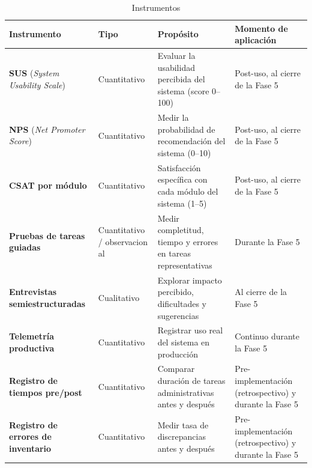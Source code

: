 \begin{longtable}[]{@{}
  >{\raggedright\arraybackslash}p{}
  >{\raggedright\arraybackslash}p{}
  >{\raggedright\arraybackslash}p{}
  >{\raggedright\arraybackslash}p{}@{}}
\caption[Instrumentos]{Instrumentos}\tabularnewline
\toprule\noalign{}
\begin{minipage}[b]{\linewidth}\raggedright
Instrumento
\end{minipage} & \begin{minipage}[b]{\linewidth}\raggedright
Tipo
\end{minipage} & \begin{minipage}[b]{\linewidth}\raggedright
Propósito
\end{minipage} & \begin{minipage}[b]{\linewidth}\raggedright
Momento de aplicación
\end{minipage} \\
\midrule\noalign{}
\endhead
\bottomrule\noalign{}
\endlastfoot
\textbf{SUS} (\emph{System Usability Scale}) & Cuantitativo & Evaluar la usabilidad percibida del sistema (score 0--100) & Post-uso, al cierre de la Fase 5 \\
\textbf{NPS} (\emph{Net Promoter Score}) & Cuantitativo & Medir la probabilidad de recomendación del sistema (0--10) & Post-uso, al cierre de la Fase 5 \\
\textbf{CSAT por módulo} & Cuantitativo & Satisfacción específica con cada módulo del sistema (1--5) & Post-uso, al cierre de la Fase 5 \\
\textbf{Pruebas de tareas guiadas} & Cuantitativo / observacion al & Medir completitud, tiempo y errores en tareas representativas & Durante la Fase 5 \\
\textbf{Entrevistas semiestructuradas} & Cualitativo & Explorar impacto percibido, dificultades y sugerencias & Al cierre de la Fase 5 \\
\textbf{Telemetría productiva} & Cuantitativo & Registrar uso real del sistema en producción & Continuo durante la Fase 5 \\
\textbf{Registro de tiempos pre/post} & Cuantitativo & Comparar duración de tareas administrativas antes y después & Pre-implementación (retrospectivo) y durante la Fase 5 \\
\textbf{Registro de errores de inventario} & Cuantitativo & Medir tasa de discrepancias antes y después & Pre-implementación (retrospectivo) y durante la Fase 5 \\
\end{longtable}

